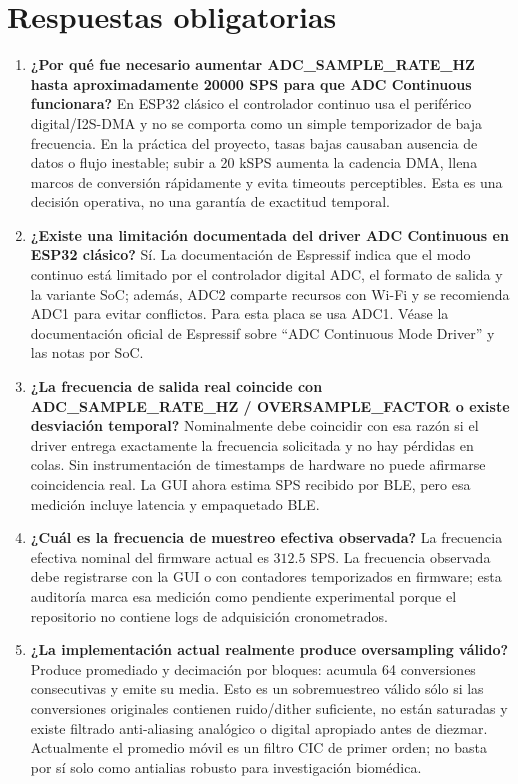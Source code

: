 \documentclass[11pt]{article}
\begin{document}
\section{Respuestas obligatorias}
\begin{enumerate}
\item \textbf{¿Por qué fue necesario aumentar ADC\_SAMPLE\_RATE\_HZ hasta aproximadamente 20000 SPS para que ADC Continuous funcionara?}  En ESP32 clásico el controlador continuo usa el periférico digital/I2S-DMA y no se comporta como un simple temporizador de baja frecuencia. En la práctica del proyecto, tasas bajas causaban ausencia de datos o flujo inestable; subir a 20 kSPS aumenta la cadencia DMA, llena marcos de conversión rápidamente y evita timeouts perceptibles. Esta es una decisión operativa, no una garantía de exactitud temporal.
\item \textbf{¿Existe una limitación documentada del driver ADC Continuous en ESP32 clásico?}  Sí. La documentación de Espressif indica que el modo continuo está limitado por el controlador digital ADC, el formato de salida y la variante SoC; además, ADC2 comparte recursos con Wi-Fi y se recomienda ADC1 para evitar conflictos. Para esta placa se usa ADC1. Véase la documentación oficial de Espressif sobre ``ADC Continuous Mode Driver'' y las notas por SoC.
\item \textbf{¿La frecuencia de salida real coincide con ADC\_SAMPLE\_RATE\_HZ / OVERSAMPLE\_FACTOR o existe desviación temporal?}  Nominalmente debe coincidir con esa razón si el driver entrega exactamente la frecuencia solicitada y no hay pérdidas en colas. Sin instrumentación de timestamps de hardware no puede afirmarse coincidencia real. La GUI ahora estima SPS recibido por BLE, pero esa medición incluye latencia y empaquetado BLE.
\item \textbf{¿Cuál es la frecuencia de muestreo efectiva observada?}  La frecuencia efectiva nominal del firmware actual es $312.5$ SPS. La frecuencia observada debe registrarse con la GUI o con contadores temporizados en firmware; esta auditoría marca esa medición como pendiente experimental porque el repositorio no contiene logs de adquisición cronometrados.
\item \textbf{¿La implementación actual realmente produce oversampling válido?}  Produce promediado y decimación por bloques: acumula 64 conversiones consecutivas y emite su media. Esto es un sobremuestreo válido sólo si las conversiones originales contienen ruido/dither suficiente, no están saturadas y existe filtrado anti-aliasing analógico o digital apropiado antes de diezmar. Actualmente el promedio móvil es un filtro CIC de primer orden; no basta por sí solo como antialias robusto para investigación biomédica.

\end{enumerate}
\end{document}
